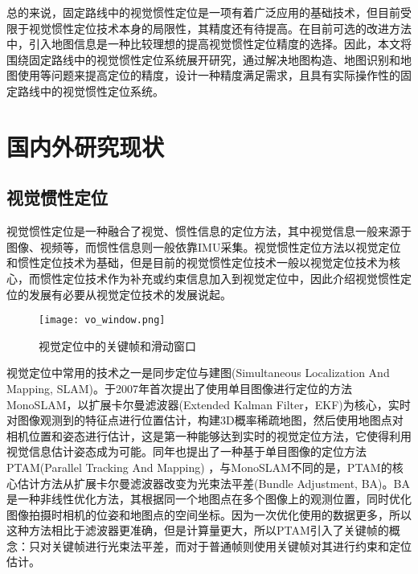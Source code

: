 总的来说，固定路线中的视觉惯性定位是一项有着广泛应用的基础技术，但目前受限于视觉惯性定位技术本身的局限性，其精度还有待提高。在目前可选的改进方法中，引入地图信息是一种比较理想的提高视觉惯性定位精度的选择。因此，本文将围绕固定路线中的视觉惯性定位系统展开研究，通过解决地图构造、地图识别和地图使用等问题来提高定位的精度，设计一种精度满足需求，且具有实际操作性的固定路线中的视觉惯性定位系统。

\section{国内外研究现状}
\subsection{视觉惯性定位}

视觉惯性定位是一种融合了视觉、惯性信息的定位方法，其中视觉信息一般来源于图像、视频等，而惯性信息则一般依靠IMU采集。视觉惯性定位方法以视觉定位和惯性定位技术为基础，但是目前的视觉惯性定位技术一般以视觉定位技术为核心，而惯性定位技术作为补充或约束信息加入到视觉定位中，因此介绍视觉惯性定位的发展有必要从视觉定位技术的发展说起。


\begin{figure}
  \centering
  \texttt{[image: vo\_window.png]}
  \caption{视觉定位中的关键帧和滑动窗口}
  \label{fig:vo_window}
\end{figure}

视觉定位中常用的技术之一是同步定位与建图(Simultaneous Localization And Mapping, SLAM)。\citet{davison2007monoslam}于2007年首次提出了使用单目图像进行定位的方法MonoSLAM，以扩展卡尔曼滤波器(Extended Kalman Filter，EKF)为核心，实时对图像观测到的特征点进行位置估计，构建3D概率稀疏地图，然后使用地图点对相机位置和姿态进行估计，这是第一种能够达到实时的视觉定位方法，它使得利用视觉信息估计姿态成为可能。同年\citet{klein2007parallel}也提出了一种基于单目图像的定位方法PTAM(Parallel Tracking And Mapping) ，与MonoSLAM不同的是，PTAM的核心估计方法从扩展卡尔曼滤波器改变为光束法平差(Bundle Adjustment, BA)\cite{triggs2000bundle}。BA是一种非线性优化方法，其根据同一个地图点在多个图像上的观测位置，同时优化图像拍摄时相机的位姿和地图点的空间坐标。因为一次优化使用的数据更多，所以这种方法相比于滤波器更准确，但是计算量更大，所以PTAM引入了关键帧的概念：只对关键帧进行光束法平差，而对于普通帧则使用关键帧对其进行约束和定位估计。


